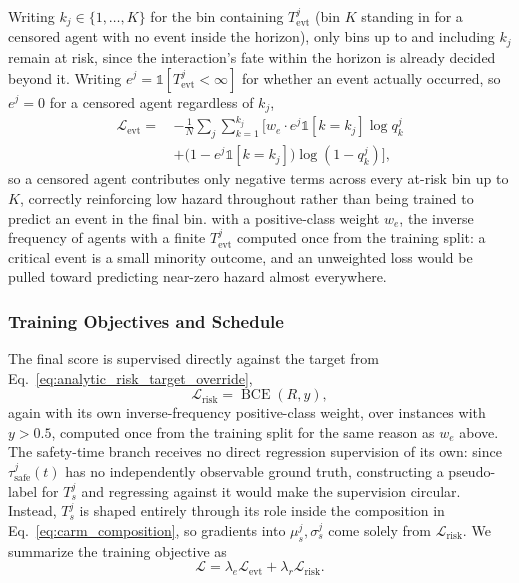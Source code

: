 \documentclass[letterpaper, 10 pt, conference]{ieeeconf}  %
\begin{document}
Writing $k_j\in\{1,\dots,K\}$ for the bin containing $T_{\mathrm{evt}}^j$
(bin $K$ standing in for a censored agent with no event inside the
horizon), only bins up to and including $k_j$ remain at risk, since the
interaction's fate within the horizon is already decided beyond it.
Writing $e^j=\mathbb 1[T_{\mathrm{evt}}^j<\infty]$ for whether an event
actually occurred, so $e^j=0$ for a censored agent regardless of $k_j$,
\begin{align}
\mathcal L_{\mathrm{evt}}
=\,&-\frac{1}{N}\sum_{j}\sum_{k=1}^{k_j}
\Big[
w_e\cdot e^j\mathbb 1[k{=}k_j]\log q_k^j
\nonumber\\
&+\big(1-e^j\mathbb 1[k{=}k_j]\big)\log(1-q_k^j)
\Big],
\label{eq:l_evt}
\end{align}
so a censored agent contributes only negative terms across every at-risk
bin up to $K$, correctly reinforcing low hazard throughout rather than
being trained to predict an event in the final bin.
with a positive-class weight $w_e$, the inverse frequency of agents with a
finite $T_{\mathrm{evt}}^j$ computed once from the training split: a
critical event is a small minority outcome, and an unweighted loss would
be pulled toward predicting near-zero hazard almost everywhere.

\subsubsection{Training Objectives and Schedule}

The final score is supervised directly against the target from
Eq.~\eqref{eq:analytic_risk_target_override},
\begin{equation}
\mathcal L_{\mathrm{risk}}=\operatorname{BCE}(R,y),
\label{eq:l_risk}
\end{equation}
again with its own inverse-frequency positive-class weight, over
instances with $y>0.5$, computed once from the training split for the
same reason as $w_e$ above. The safety-time branch receives no direct
regression supervision of its own: since $\tau_{\mathrm{safe}}^{j}(t)$ has
no independently observable ground truth, constructing a pseudo-label for
$T_s^j$ and regressing against it would make the supervision circular.
Instead, $T_s^j$ is shaped entirely through its role inside the
composition in Eq.~\eqref{eq:carm_composition}, so gradients into
$\mu_s^j,\sigma_s^j$ come solely from $\mathcal L_{\mathrm{risk}}$. We
summarize the training objective as
\begin{equation}
\mathcal L
=\lambda_e\mathcal L_{\mathrm{evt}}
+\lambda_r\mathcal L_{\mathrm{risk}}.
\label{eq:carm_training_objective}
\end{equation}
\end{document}
